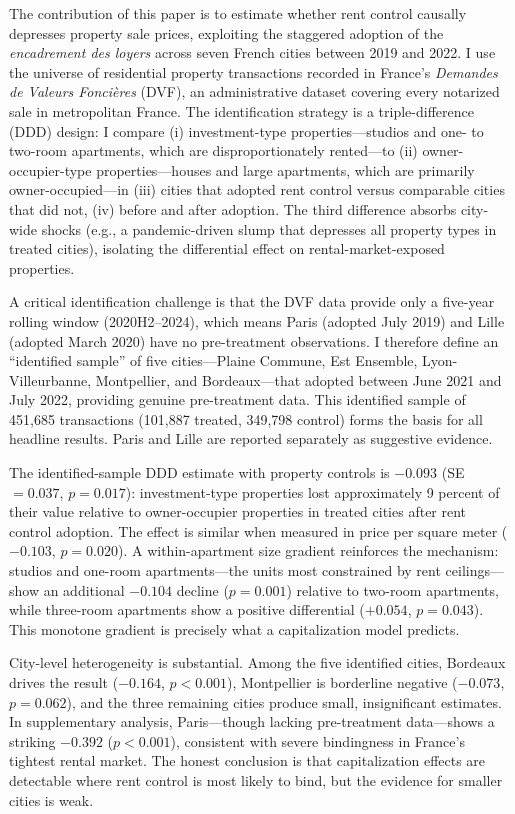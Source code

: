 \documentclass[12pt]{article}
\begin{document}
The contribution of this paper is to estimate whether rent control causally depresses property sale prices, exploiting the staggered adoption of the \emph{encadrement des loyers} across seven French cities between 2019 and 2022. I use the universe of residential property transactions recorded in France's \emph{Demandes de Valeurs Fonci\`eres} (DVF), an administrative dataset covering every notarized sale in metropolitan France. The identification strategy is a triple-difference (DDD) design: I compare (i) investment-type properties---studios and one- to two-room apartments, which are disproportionately rented---to (ii) owner-occupier-type properties---houses and large apartments, which are primarily owner-occupied---in (iii) cities that adopted rent control versus comparable cities that did not, (iv) before and after adoption. The third difference absorbs city-wide shocks (e.g., a pandemic-driven slump that depresses all property types in treated cities), isolating the differential effect on rental-market-exposed properties.

A critical identification challenge is that the DVF data provide only a five-year rolling window (2020H2--2024), which means Paris (adopted July 2019) and Lille (adopted March 2020) have no pre-treatment observations. I therefore define an ``identified sample'' of five cities---Plaine Commune, Est Ensemble, Lyon-Villeurbanne, Montpellier, and Bordeaux---that adopted between June 2021 and July 2022, providing genuine pre-treatment data. This identified sample of 451,685 transactions (101,887 treated, 349,798 control) forms the basis for all headline results. Paris and Lille are reported separately as suggestive evidence.

The identified-sample DDD estimate with property controls is $-0.093$ (SE $= 0.037$, $p = 0.017$): investment-type properties lost approximately 9 percent of their value relative to owner-occupier properties in treated cities after rent control adoption. The effect is similar when measured in price per square meter ($-0.103$, $p = 0.020$). A within-apartment size gradient reinforces the mechanism: studios and one-room apartments---the units most constrained by rent ceilings---show an additional $-0.104$ decline ($p = 0.001$) relative to two-room apartments, while three-room apartments show a positive differential ($+0.054$, $p = 0.043$). This monotone gradient is precisely what a capitalization model predicts.

City-level heterogeneity is substantial. Among the five identified cities, Bordeaux drives the result ($-0.164$, $p < 0.001$), Montpellier is borderline negative ($-0.073$, $p = 0.062$), and the three remaining cities produce small, insignificant estimates. In supplementary analysis, Paris---though lacking pre-treatment data---shows a striking $-0.392$ ($p < 0.001$), consistent with severe bindingness in France's tightest rental market. The honest conclusion is that capitalization effects are detectable where rent control is most likely to bind, but the evidence for smaller cities is weak.
\end{document}
